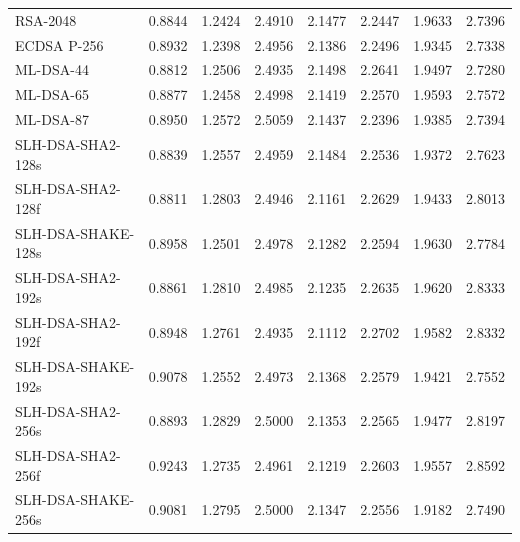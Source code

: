 \documentclass[11pt, letterpaper]{article}
\begin{document}
\begin{table}[H]
\begin{longtable}{lccccccc}
RSA-2048 & 0.8844 & 1.2424 & 2.4910 & 2.1477 & 2.2447 & 1.9633 & 2.7396 \\
ECDSA P-256 & 0.8932 & 1.2398 & 2.4956 & 2.1386 & 2.2496 & 1.9345 & 2.7338 \\
ML-DSA-44 & 0.8812 & 1.2506 & 2.4935 & 2.1498 & 2.2641 & 1.9497 & 2.7280 \\
ML-DSA-65 & 0.8877 & 1.2458 & 2.4998 & 2.1419 & 2.2570 & 1.9593 & 2.7572 \\
ML-DSA-87 & 0.8950 & 1.2572 & 2.5059 & 2.1437 & 2.2396 & 1.9385 & 2.7394 \\
SLH-DSA-SHA2-128s & 0.8839 & 1.2557 & 2.4959 & 2.1484 & 2.2536 & 1.9372 & 2.7623 \\
SLH-DSA-SHA2-128f & 0.8811 & 1.2803 & 2.4946 & 2.1161 & 2.2629 & 1.9433 & 2.8013 \\
SLH-DSA-SHAKE-128s & 0.8958 & 1.2501 & 2.4978 & 2.1282 & 2.2594 & 1.9630 & 2.7784 \\
SLH-DSA-SHA2-192s & 0.8861 & 1.2810 & 2.4985 & 2.1235 & 2.2635 & 1.9620 & 2.8333 \\
SLH-DSA-SHA2-192f & 0.8948 & 1.2761 & 2.4935 & 2.1112 & 2.2702 & 1.9582 & 2.8332 \\
SLH-DSA-SHAKE-192s & 0.9078 & 1.2552 & 2.4973 & 2.1368 & 2.2579 & 1.9421 & 2.7552 \\
SLH-DSA-SHA2-256s & 0.8893 & 1.2829 & 2.5000 & 2.1353 & 2.2565 & 1.9477 & 2.8197 \\
SLH-DSA-SHA2-256f & 0.9243 & 1.2735 & 2.4961 & 2.1219 & 2.2603 & 1.9557 & 2.8592 \\
SLH-DSA-SHAKE-256s & 0.9081 & 1.2795 & 2.5000 & 2.1347 & 2.2556 & 1.9182 & 2.7490 \\

\hline

\end{longtable}

\end{table}
\end{document}
